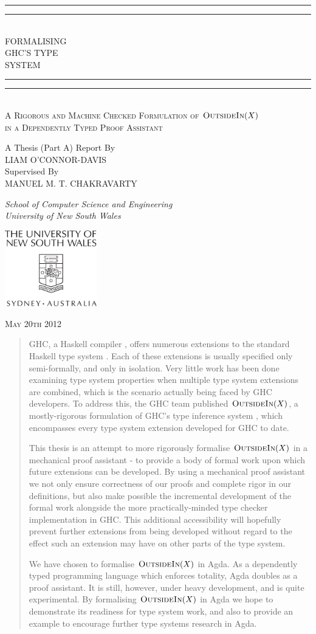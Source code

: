 \documentclass[a4paper]{jfp}
\newlength{\tpheight}\setlength{\tpheight}{0.9\textheight}
\newlength{\txtheight}\setlength{\txtheight}{0.9\tpheight}
\newlength{\tpwidth}\setlength{\tpwidth}{0.9\textwidth}
\newlength{\txtwidth}\setlength{\txtwidth}{0.9\tpwidth}
\newlength{\drop}
\newcommand{\outsidein}{\textsc{OutsideIn}(X)}
\newcommand*{\titleGP}{\begingroup%

\drop=0.1\txtheight
\centering
\vspace*{\baselineskip}
\rule{\txtwidth}{1.6pt}\vspace*{-\baselineskip}\vspace*{2pt}
\rule{\txtwidth}{0.4pt}\\[\baselineskip]
{\LARGE FORMALISING\\ GHC'S TYPE \\[0.3\baselineskip] SYSTEM}\\[0.2\baselineskip]
\rule{\txtwidth}{0.4pt}\vspace*{-\baselineskip}\vspace{3.2pt}
\rule{\txtwidth}{1.6pt}\\[\baselineskip]
\scshape
A Rigorous and Machine Checked Formulation of $\textsc{OutsideIn}(X)$ \\
in a Dependently Typed Proof Assistant \\
\par
\vspace*{2\baselineskip}
A Thesis (Part A) Report By \\[\baselineskip]
{\Large LIAM O'CONNOR-DAVIS}
 \\[\baselineskip]
Supervised By \\[\baselineskip]
{\Large MANUEL M. T. CHAKRAVARTY}
 \\[\baselineskip]
{\itshape School of Computer Science and Engineering \\ University of New South Wales \par}
\vfill
\includegraphics[width=4cm]{unswcrest.pdf} \\

\medskip

{\scshape May 20th 2012} \\
\par
\endgroup}
\begin{document}
\pagestyle{empty}
\titleGP
\clearpage
\pagestyle{plain}
\begin{abstract}
GHC, a Haskell compiler \cite{Anonymous:2010we}, offers numerous extensions to the standard Haskell type system \cite{Schrijvers:2009jg, Yorgey:2012:GHP:2103786.2103795, citeulike:9320233, Jones:2007dr}. Each of these extensions is usually specified only semi-formally, and only in isolation. Very little work has been done examining type system properties when multiple type system extensions are combined, which is the scenario actually being faced by GHC developers. To address this, the GHC team published $\outsidein$, a mostly-rigorous formulation of GHC's type inference system \cite{Vytiniotis:2011:OMT:2139531.2139533}, which encompasses every type system extension developed for GHC to date. 

This thesis is an attempt to more rigorously formalise $\outsidein$ in a mechanical proof assistant - to provide a body of formal work upon which future extensions can be developed. By using a mechanical proof assistant we not only ensure correctness of our proofs and complete rigor in our definitions, but also make possible the incremental development of the formal work alongside the more practically-minded type checker implementation in GHC. This additional accessibility will hopefully prevent further extensions from being developed without regard to the effect such an extension may have on other parts of the type system.

We have chosen to formalise $\outsidein$ in Agda\cite{conf/afp/norell08}. As a dependently typed programming language which enforces totality, Agda doubles as a proof assistant\cite{Howard:1980vs}. It is still, however, under heavy development, and is quite experimental. By formalising $\outsidein$ in Agda we hope to demonstrate its readiness for type system work, and also to provide an example to encourage further type systems research in Agda.
\end{abstract}

\tableofcontents
\newpage
\end{document}

